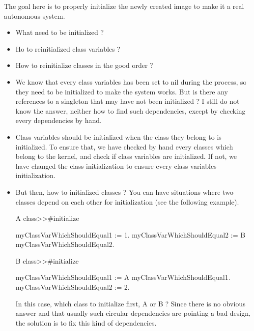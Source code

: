 \goal The goal here is to properly initialize the newly created image to make it a real autonomous system.

\problems
\begin{itemize}
	\item What need to be initialized ?
	\item Ho to reinitialized class variables ?
	\item How to reinitialize classes in the good order ?
\end{itemize}

\solutions
\begin{itemize}
	\item We know that every class variables has been set to nil during the process, so they need to be initialized to make the system works. But is there any references to a singleton that may have not been initialized ? I still do not know the answer, neither how to find such dependencies, except by checking every dependencies by hand.
	\item Class variables should be initialized when the class they belong to is initialized. To ensure that, we have checked by hand every classes which belong to the kernel, and check if class variables are initialized. If not, we have changed the class initialization to ensure every class variables initialization.
	\item But then, how to initialized classes ? You can have situations where two classes depend on each other for initialization (see the following example).
	\begin{code}{}\label{initializationCross}
A class>>#initialize
	
\tab myClassVarWhichShouldEqual1 := 1.
\tab myClassVarWhichShouldEqual2 := B myClassVarWhichShouldEqual2.
	
B class>>#initialize
	
\tab myClassVarWhichShouldEqual1 := A myClassVarWhichShouldEqual1.
\tab myClassVarWhichShouldEqual2 := 2.
	\end{code}
In this case, which class to initialize first, A or B ? Since there is no obvious answer and that usually such circular dependencies are pointing a bad design, the solution is to fix this kind of dependencies.
\end{itemize}
	